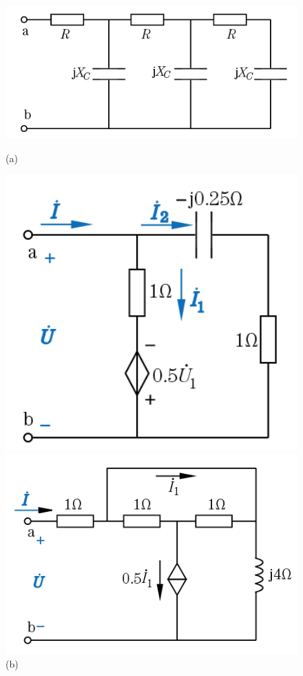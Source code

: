 \documentclass[hyperref, UTF8]{ctexart}
\begin{document}
\begin{figure}[!htb]
\centering
\begin{minipage}[t]{0.347\textwidth}
\centering
\includegraphics[width=1\textwidth]{p11-8-a.png}
\caption*{(a)}
\end{minipage}
\begin{minipage}[t]{0.243\textwidth}
\centering
\includegraphics[width=1\textwidth]{p11-8-b.png}
\caption*{(b)}
\end{minipage}
\begin{minipage}[t]{0.312\textwidth}
\centering
\includegraphics[width=1\textwidth]{p11-8-c.png}

\end{minipage}
\end{figure}
\end{document}
